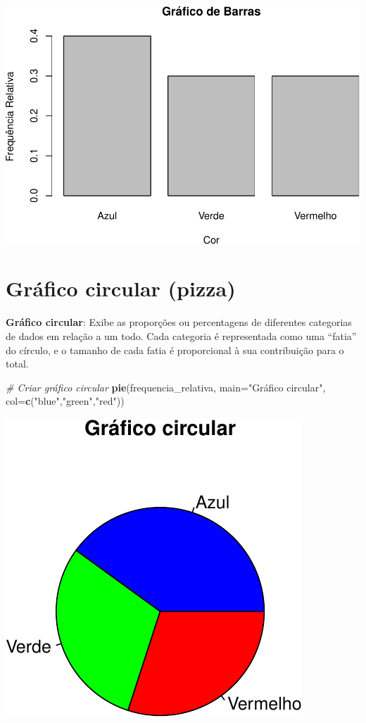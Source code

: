 \documentclass[
]{book}
\newenvironment{Shaded}{\begin{snugshade}}{\end{snugshade}}
\newcommand{\AttributeTok}[1]{\textcolor[rgb]{0.13,0.29,0.53}{#1}}
\newcommand{\CommentTok}[1]{\textcolor[rgb]{0.56,0.35,0.01}{\textit{#1}}}
\newcommand{\FunctionTok}[1]{\textcolor[rgb]{0.13,0.29,0.53}{\textbf{#1}}}
\newcommand{\NormalTok}[1]{#1}
\newcommand{\StringTok}[1]{\textcolor[rgb]{0.31,0.60,0.02}{#1}}
\begin{document}
\includegraphics{meuLivro2_files/figure-latex/unnamed-chunk-105-1.pdf}

\section{Gráfico circular (pizza)}\label{gruxe1fico-circular-pizza}

\textbf{Gráfico circular}: Exibe as proporções ou percentagens de diferentes categorias de dados em relação a um todo. Cada categoria é representada como uma ``fatia'' do círculo, e o tamanho de cada fatia é proporcional à sua contribuição para o total.

\begin{Shaded}
\begin{Highlighting}[]
\CommentTok{\# Criar gráfico circular}
\FunctionTok{pie}\NormalTok{(frequencia\_relativa, }\AttributeTok{main=}\StringTok{"Gráfico circular"}\NormalTok{,}
  \AttributeTok{col=}\FunctionTok{c}\NormalTok{(}\StringTok{"blue"}\NormalTok{,}\StringTok{"green"}\NormalTok{,}\StringTok{"red"}\NormalTok{))}
\end{Highlighting}
\end{Shaded}

\includegraphics{meuLivro2_files/figure-latex/unnamed-chunk-106-1.pdf}
\end{document}
